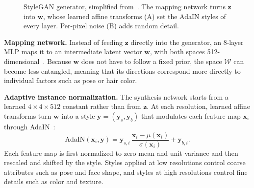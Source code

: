 \documentclass[conference]{IEEEtran}
\begin{document}
\begin{figure}[t]
\centering
{}
\caption{StyleGAN generator, simplified from~\cite{karras2019}. The mapping network turns $\mathbf{z}$ into $\mathbf{w}$, whose learned affine transforms (A) set the AdaIN styles of every layer. Per-pixel noise (B) adds random detail.}
\label{fig:style}
\end{figure}

\textbf{Mapping network.} Instead of feeding $\mathbf{z}$ directly into the generator, an 8-layer MLP maps it to an intermediate latent vector $\mathbf{w}$, with both spaces 512-dimensional~\cite{karras2019}. Because $\mathbf{w}$ does not have to follow a fixed prior, the space $\mathcal{W}$ can become less entangled, meaning that its directions correspond more directly to individual factors such as pose or hair color.

\textbf{Adaptive instance normalization.} The synthesis network starts from a learned $4\times4\times512$ constant rather than from $\mathbf{z}$. At each resolution, learned affine transforms turn $\mathbf{w}$ into a style $\mathbf{y}=(\mathbf{y}_s,\mathbf{y}_b)$ that modulates each feature map $\mathbf{x}_i$ through AdaIN~\cite[Eq.~1]{karras2019}:
\begin{equation}
\mathrm{AdaIN}(\mathbf{x}_i,\mathbf{y})=\mathbf{y}_{s,i}\,\frac{\mathbf{x}_i-\mu(\mathbf{x}_i)}{\sigma(\mathbf{x}_i)}+\mathbf{y}_{b,i}.
\end{equation}
Each feature map is first normalized to zero mean and unit variance and then rescaled and shifted by the style. Styles applied at low resolutions control coarse attributes such as pose and face shape, and styles at high resolutions control fine details such as color and texture.
\end{document}
